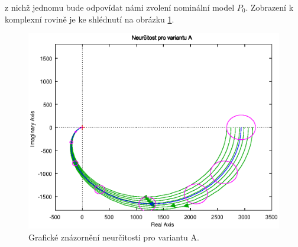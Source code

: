 \documentclass[a4paper,11pt]{article}
\begin{document}
z nichž jednomu bude odpovídat námi zvolení nominální model $ P_{0} $. Zobrazení k komplexní rovině je ke shlédnutí na obrázku \ref{fig:neurcitost-A}.
\begin{figure}[htbp]
	\begin{center}
	\includegraphics[scale = 1.0]{obrazky/neurcitostA.eps}
	\caption{Grafické znázornění neurčitosti pro variantu A.}
	\label{fig:neurcitost-A}
	\end{center}
\end{figure}
\end{document}
